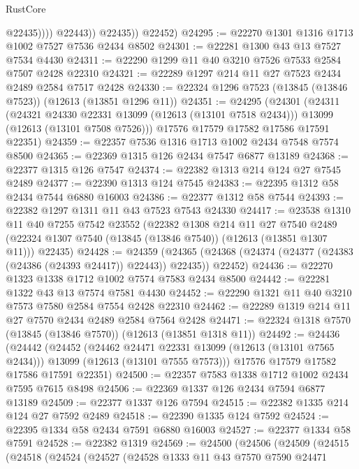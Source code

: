 \begin{lexlean}{RustCore}
\begin{coremodule}
                      @22435))))
              @22443))
          @22435))
      @22452)
@24295 := @22270 @1301 @1316 @1713 @1002 @7527 @7536 @2434 @8502
@24301 := @22281 @1300 @43 @13 @7527 @7534 @4430
@24311 := @22290 @1299 @11 @40 @3210 @7526 @7533 @2584 @7507 @2428 @22310
@24321 := @22289 @1297 @214 @11 @27 @7523 @2434 @2489 @2584 @7517 @2428
@24330 := @22324 @1296 @7523 (@13845 (@13846 @7523)) (@12613 (@13851 @1296 @11))
@24351 := @24295
    (@24301
      (@24311
        (@24321 @24330 @22331 @13099 (@12613 (@13101 @7518 @2434)))
        @13099
        (@12613 (@13101 @7508 @7526)))
      @17576
      @17579
      @17582
      @17586
      @17591
      @22351)
@24359 := @22357 @7536 @1316 @1713 @1002 @2434 @7548 @7574 @8500
@24365 := @22369 @1315 @126 @2434 @7547 @6877 @13189
@24368 := @22377 @1315 @126 @7547
@24374 := @22382 @1313 @214 @124 @27 @7545 @2489
@24377 := @22390 @1313 @124 @7545
@24383 := @22395 @1312 @58 @2434 @7544 @6880 @16003
@24386 := @22377 @1312 @58 @7544
@24393 := @22382 @1297 @1311 @11 @43 @7523 @7543 @24330
@24417 := @23538
    @1310
    @11
    @40
    @7255
    @7542
    @23552
    (@22382
      @1308
      @214
      @11
      @27
      @7540
      @2489
      (@22324 @1307 @7540 (@13845 (@13846 @7540)) (@12613 (@13851 @1307 @11)))
      @22435)
@24428 := @24359
    (@24365 (@24368 (@24374 (@24377 (@24383 (@24386 (@24393 @24417)) @22443)) @22435)) @22452)
@24436 := @22270 @1323 @1338 @1712 @1002 @7574 @7583 @2434 @8500
@24442 := @22281 @1322 @43 @13 @7574 @7581 @4430
@24452 := @22290 @1321 @11 @40 @3210 @7573 @7580 @2584 @7554 @2428 @22310
@24462 := @22289 @1319 @214 @11 @27 @7570 @2434 @2489 @2584 @7564 @2428
@24471 := @22324 @1318 @7570 (@13845 (@13846 @7570)) (@12613 (@13851 @1318 @11))
@24492 := @24436
    (@24442
      (@24452
        (@24462 @24471 @22331 @13099 (@12613 (@13101 @7565 @2434)))
        @13099
        (@12613 (@13101 @7555 @7573)))
      @17576
      @17579
      @17582
      @17586
      @17591
      @22351)
@24500 := @22357 @7583 @1338 @1712 @1002 @2434 @7595 @7615 @8498
@24506 := @22369 @1337 @126 @2434 @7594 @6877 @13189
@24509 := @22377 @1337 @126 @7594
@24515 := @22382 @1335 @214 @124 @27 @7592 @2489
@24518 := @22390 @1335 @124 @7592
@24524 := @22395 @1334 @58 @2434 @7591 @6880 @16003
@24527 := @22377 @1334 @58 @7591
@24528 := @22382 @1319
@24569 := @24500
    (@24506
      (@24509
        (@24515
          (@24518
            (@24524
              (@24527
                (@24528
                  @1333
                  @11
                  @43
                  @7570
                  @7590
                  @24471

\end{coremodule}
\end{lexlean}
